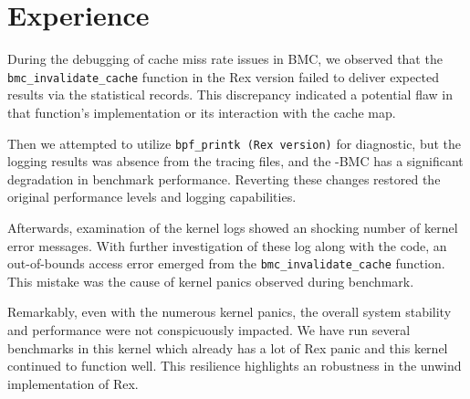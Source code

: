 \section{Experience}
During the debugging of cache miss rate issues in BMC, we observed that the
\texttt{bmc\_invalidate\_cache} function in the Rex version failed to deliver expected
    results via the statistical records.
This discrepancy indicated a potential flaw in that function's implementation
    or its interaction with the cache map.

    Then we attempted to utilize \texttt{bpf\_printk (Rex version)} for diagnostic, but
    the logging results was absence from the tracing files,
    and the \projname{}-BMC has a significant degradation in benchmark performance.
Reverting these changes restored the original performance levels and logging capabilities.

Afterwards, examination of the kernel logs showed an shocking number of kernel error messages.
With further investigation of these log along with the code, an out-of-bounds access error
emerged from the \texttt{bmc\_invalidate\_cache} function.
This mistake was the cause of kernel panics observed during benchmark.

Remarkably, even with the numerous kernel panics, the overall system stability
    and performance were not conspicuously impacted.
We have run several benchmarks in this kernel which already has a lot of Rex panic
    and this kernel continued to function well.
This resilience highlights an robustness in the unwind implementation of Rex.

